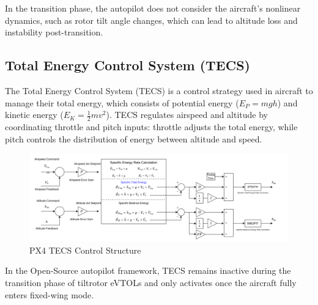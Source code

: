 \documentclass[journal,article,submit,pdftex,moreauthors]{Definitions/mdpi}
\begin{document}
\begin{center}
 \end{center}


In the transition phase, the autopilot does not consider the aircraft's nonlinear dynamics, such as rotor tilt angle changes, which can lead to altitude loss and instability post-transition.

\subsection{Total Energy Control System (TECS)}
The Total Energy Control System (TECS) is a control strategy used in aircraft to manage their total energy, which consists of potential energy (\(E_P = mgh\)) and kinetic energy (\(E_K = \frac{1}{2}mv^2\)). TECS regulates airspeed and altitude by coordinating throttle and pitch inputs: throttle adjusts the total energy, while pitch controls the distribution of energy between altitude and speed.

\begin{figure}[H]
    \centering
    \includegraphics[width=1\linewidth]{PX4_TECS_Structure.png}
    \caption{PX4 TECS Control Structure}
    \label{fig:enter-label}
\end{figure}
In the Open-Source autopilot framework, TECS remains inactive during the transition phase of tiltrotor eVTOLs and only activates once the aircraft fully enters fixed-wing mode.
\end{document}
